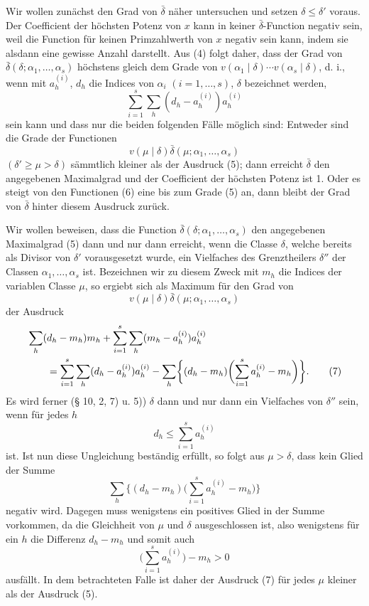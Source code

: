 \documentclass[11pt,a4paper]{article}
\begin{document}
Wir wollen zunächst den Grad von $\bar\delta$ näher untersuchen und setzen $\delta\le\delta'$ voraus. Der Coefficient der höchsten Potenz von $x$ kann in keiner $\bar\delta$-Function negativ sein, weil die Function für keinen Primzahlwerth von $x$ negativ sein kann, indem sie alsdann eine gewisse Anzahl darstellt. Aus (4) folgt daher, dass der Grad von $\bar\delta(\delta;\alpha_1,\ldots,
\alpha_s)$ höchstens gleich dem Grade von $v(\alpha_1\mid\delta)\cdots v(\alpha_s\mid\delta)$, d. i., wenn mit $a_h^{(i)}$, $d_h$ die Indices von $\alpha_i$ $(i=1,
\ldots,s)$, $\delta$ bezeichnet werden,
\begin{equation}
 \sum_{i=1}^s\sum_h(d_h-a_h^{(i)})a_h^{(i)}
\tag{5}
\end{equation}
sein kann und dass nur die beiden folgenden Fälle möglich sind: Entweder sind die Grade der Functionen
\begin{equation}
 v(\mu\mid\delta)\bar\delta(\mu;\alpha_1,\ldots,\alpha_s)
\tag{6}
\end{equation}
$(\delta'\ge\mu>\delta)$ sämmtlich kleiner als der Ausdruck (5); dann erreicht $\bar\delta$ den angegebenen Maximalgrad und der Coefficient der höchsten Potenz ist 1. Oder es steigt von den Functionen (6) eine bis zum Grade (5) an, dann bleibt der Grad von $\bar\delta$ hinter diesem Ausdruck zurück.

Wir wollen beweisen, dass die Function $\bar\delta(\delta;\alpha_1,
\ldots,\alpha_s)$ den angegebenen Maximalgrad (5) dann und nur dann erreicht, wenn die Classe $\delta$, welche bereits als Divisor von $\delta'$ vorausgesetzt wurde, ein Vielfaches des Grenztheilers $\delta''$ der Classen $\alpha_1,
\ldots,\alpha_s$ ist. Bezeichnen wir zu diesem Zweck mit $m_h$ die Indices der variablen Classe $\mu$, so ergiebt sich als Maximum für den Grad von
\[
 v(\mu\mid\delta)\bar\delta(\mu;\alpha_1,\ldots,\alpha_s)
\]
der Ausdruck
\begin{align}
&\sum_h(d_h-m_h)m_h+\sum_{i=1}^s\sum_h(m_h-a_h^{(i)})a_h^{(i)} \notag\\
&\qquad =\sum_{i=1}^s\sum_h(d_h-a_h^{(i)})a_h^{(i)}
 -\sum_h\biggl\{(d_h-m_h)\biggl(\sum_{i=1}^s a_h^{(i)}-m_h\biggr)\biggr\}.
\tag{7}
\end{align}
Es wird ferner (§ 10, 2, 7) u. 5)) $\delta$ dann und nur dann ein Vielfaches von $\delta''$ sein, wenn für jedes $h$
\begin{equation}
 d_h\le\sum_{i=1}^s a_h^{(i)}
\tag{8}
\end{equation}
ist. Ist nun diese Ungleichung beständig erfüllt, so folgt aus $\mu>\delta$, dass kein Glied der Summe
\begin{equation}
 \sum_h\biggl\{(d_h-m_h)\biggl(\sum_{i=1}^s a_h^{(i)}-m_h\biggr)\biggr\}
\tag{9}
\end{equation}
negativ wird. Dagegen muss wenigstens ein positives Glied in der Summe vorkommen, da die Gleichheit von $\mu$ und $\delta$ ausgeschlossen ist, also wenigstens für ein $h$ die Differenz $d_h-m_h$ und somit auch
\[
 \biggl(\sum_{i=1}^s a_h^{(i)}\biggr)-m_h>0
\]
ausfällt. In dem betrachteten Falle ist daher der Ausdruck (7) für jedes $\mu$ kleiner als der Ausdruck (5).
\end{document}

